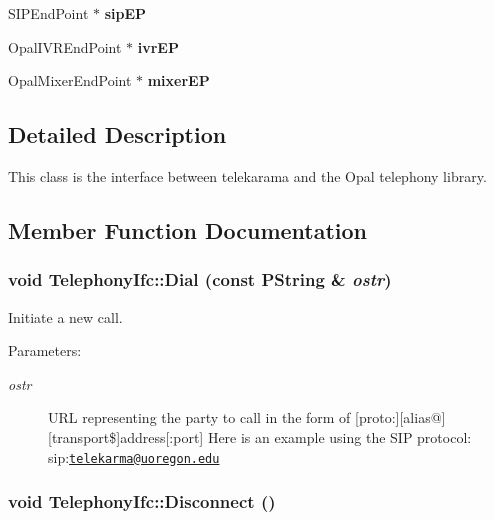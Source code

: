 \begin{CompactItemize}
\item 
\hypertarget{classTelephonyIfc_67fb79d2bcec4cc072421a5b4c2f4e16}{
SIPEndPoint $\ast$ \textbf{sipEP}}
\label{classTelephonyIfc_67fb79d2bcec4cc072421a5b4c2f4e16}

\item 
\hypertarget{classTelephonyIfc_022bae204ef5d791f5ea8184a1928fb9}{
OpalIVREndPoint $\ast$ \textbf{ivrEP}}
\label{classTelephonyIfc_022bae204ef5d791f5ea8184a1928fb9}

\item 
\hypertarget{classTelephonyIfc_f15ba6ddee44e5a1908044ba8a83eaa3}{
OpalMixerEndPoint $\ast$ \textbf{mixerEP}}
\label{classTelephonyIfc_f15ba6ddee44e5a1908044ba8a83eaa3}

\end{CompactItemize}


\subsection{Detailed Description}
This class is the interface between telekarama and the Opal telephony library. 

\subsection{Member Function Documentation}
\hypertarget{classTelephonyIfc_2e0adbafa63cd9c07a1c1c6ce68bf933}{
\subsubsection[{Dial}]{\setlength{\rightskip}{0pt plus 5cm}void TelephonyIfc::Dial (const PString \& {\em ostr})}}
\label{classTelephonyIfc_2e0adbafa63cd9c07a1c1c6ce68bf933}


Initiate a new call. 

\begin{Desc}
\item[Parameters:]
\begin{description}
\item[{\em ostr}]URL representing the party to call in the form of \mbox{[}proto:\mbox{]}\mbox{[}alias@\mbox{]}\mbox{[}transport\$\mbox{]}address\mbox{[}:port\mbox{]} Here is an example using the SIP protocol: sip:\href{mailto:telekarma@uoregon.edu}{\tt telekarma@uoregon.edu} \end{description}
\end{Desc}
\hypertarget{classTelephonyIfc_68160576582be102ace0f4ae277d7129}{
\subsubsection[{Disconnect}]{\setlength{\rightskip}{0pt plus 5cm}void TelephonyIfc::Disconnect ()}}
\label{classTelephonyIfc_68160576582be102ace0f4ae277d7129}


